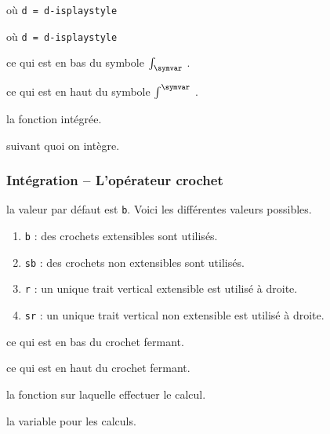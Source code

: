 \documentclass[12pt,a4paper]{article}
\theoremstyle{definition}
\newcommand\mwhyprefix[2]{%
	\texttt{#1 = #1-#2}%
}
\begin{document}
   où \quad \mwhyprefix{d}{isplaystyle}

  où \quad \mwhyprefix{d}{isplaystyle}

 ce qui est en bas du symbole $\int_{\symvar}$ .

 ce qui est en haut du symbole $\int^{\symvar}$ .

 la fonction intégrée.

 suivant quoi on intègre.





\subsubsection{Intégration -- L'opérateur crochet}



\IDoption{} la valeur par défaut est \verb+b+. Voici les différentes valeurs possibles.
\begin{enumerate}
	\item \verb+b+ : des crochets extensibles sont utilisés.

	\item \verb+sb+ : des crochets non extensibles sont utilisés.

	\item \verb+r+ : un unique trait vertical extensible est utilisé à droite.

	\item \verb+sr+ : un unique trait vertical non extensible est utilisé à droite.
\end{enumerate}

 ce qui est en bas du crochet fermant.

 ce qui est en haut du crochet fermant.

 la fonction sur laquelle effectuer le calcul.

 la variable pour les calculs.
\newpage
\end{document}
